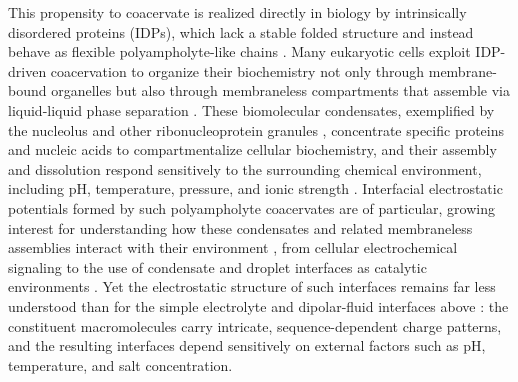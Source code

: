 \documentclass[journal=amlccd,manuscript=article,layout=twocolumn]{achemso}
\begin{document}
This propensity to coacervate is realized directly in biology by intrinsically disordered proteins (IDPs), which lack a stable folded structure and instead behave as flexible polyampholyte-like chains \cite{uverskyIntrinsicallyDisorderedProteins2015}. Many eukaryotic cells exploit IDP-driven coacervation to organize their biochemistry not only through membrane-bound organelles but also through membraneless compartments that assemble via liquid-liquid phase separation \cite{hymanLiquidLiquidPhaseSeparation2014,bananiBiomolecularCondensatesOrganizers2017}. These biomolecular condensates, exemplified by the nucleolus and other ribonucleoprotein granules \cite{brangwynneActiveLiquidlikeBehavior2011,nottPhaseTransitionDisordered2015}, concentrate specific proteins and nucleic acids to compartmentalize cellular biochemistry, and their assembly and dissolution respond sensitively to the surrounding chemical environment, including pH, temperature, pressure, and ionic strength \cite{cinarPressureInducedDissolutionReentrant2018,albertiCurrentPracticesStudy2025}. Interfacial electrostatic potentials formed by such polyampholyte coacervates are of particular, growing interest for understanding how these condensates and related membraneless assemblies interact with their environment \cite{daiBiomolecularCondensatesRegulate2024,daiUnlockingElectrochemicalFunctions2024}, from cellular electrochemical signaling to the use of condensate and droplet interfaces as catalytic environments \cite{chenBiomolecularCondensatesCan2026}. Yet the electrostatic structure of such interfaces remains far less understood than for the simple electrolyte and dipolar-fluid interfaces above \cite{varnerStockmayerFluidShifted2026,walkerStockmayerFluidShifted2026a}: the constituent macromolecules carry intricate, sequence-dependent charge patterns, and the resulting interfaces depend sensitively on external factors such as pH, temperature, and salt concentration.
\end{document}
